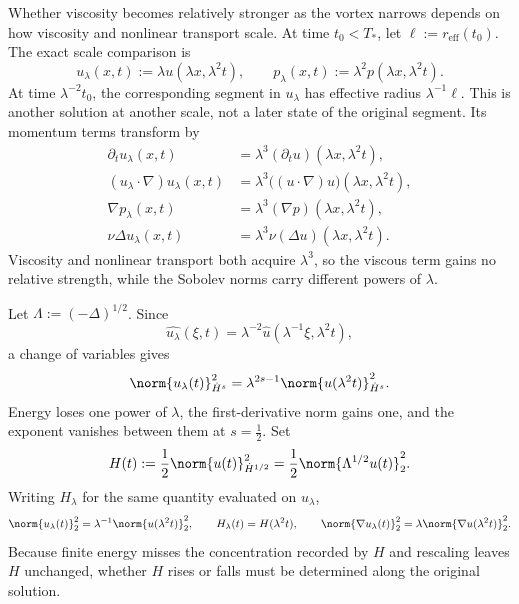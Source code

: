 
Whether viscosity becomes relatively stronger as the vortex narrows depends on how viscosity and nonlinear transport scale.
At time \(t_0<T_*\), let \(\ell:=r_{\mathrm{eff}}(t_0)\). The exact scale comparison is
\[
  u_\lambda(x,t)
  :=
  \lambda u(\lambda x,\lambda^2t),
  \qquad
  p_\lambda(x,t)
  :=
  \lambda^2p(\lambda x,\lambda^2t).
\]
At time \(\lambda^{-2}t_0\), the corresponding segment in \(u_\lambda\) has effective radius \(\lambda^{-1}\ell\). This is another solution at another scale, not a later state of the original segment. Its momentum terms transform by
\[
\begin{aligned}
  \partial_tu_\lambda(x,t)
  &=
  \lambda^3(\partial_tu)(\lambda x,\lambda^2t),
  \\
  (u_\lambda\cdot\nabla)u_\lambda(x,t)
  &=
  \lambda^3\bigl((u\cdot\nabla)u\bigr)(\lambda x,\lambda^2t),
  \\
  \nabla p_\lambda(x,t)
  &=
  \lambda^3(\nabla p)(\lambda x,\lambda^2t),
  \\
  \nu\Delta u_\lambda(x,t)
  &=
  \lambda^3\nu(\Delta u)(\lambda x,\lambda^2t).
\end{aligned}
\]
Viscosity and nonlinear transport both acquire \(\lambda^3\), so the viscous term gains no relative strength, while the Sobolev norms carry different powers of \(\lambda\).


Let \(\Lambda:=(-\Delta)^{1/2}\). Since
\[
  \widehat{u_\lambda}(\xi,t)
  =
  \lambda^{-2}\widehat u(\lambda^{-1}\xi,\lambda^2t),
\]
a change of variables gives
\[
  \norm{u_\lambda(t)}_{\dot H^s}^2
  =
  \lambda^{2s-1}
  \norm{u(\lambda^2t)}_{\dot H^s}^2.
\]
Energy loses one power of \(\lambda\), the first-derivative norm gains one, and the exponent vanishes between them at \(s=\tfrac12\). Set
\[
  H(t)
  :=
  \frac12\norm{u(t)}_{\dot H^{1/2}}^2
  =
  \frac12\norm{\Lambda^{1/2}u(t)}_2^2.
\]
Writing \(H_\lambda\) for the same quantity evaluated on \(u_\lambda\),
\[
  \norm{u_\lambda(t)}_2^2
  =
  \lambda^{-1}\norm{u(\lambda^2t)}_2^2,
  \qquad
  H_\lambda(t)=H(\lambda^2t),
  \qquad
  \norm{\nabla u_\lambda(t)}_2^2
  =
  \lambda\norm{\nabla u(\lambda^2t)}_2^2.
\]
Because finite energy misses the concentration recorded by \(H\) and rescaling leaves \(H\) unchanged, whether \(H\) rises or falls must be determined along the original solution.


